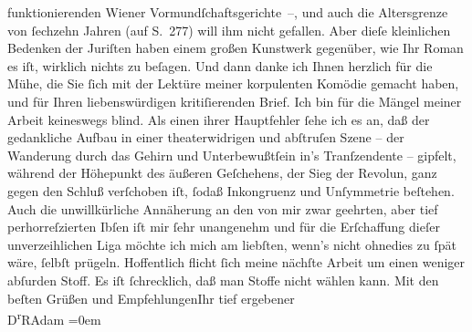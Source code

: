 \begin{ledgroupsized}[t]{13cm}
               funktionierenden Wiener Vormundſchaftsgerichte –,
               und auch die Altersgrenze von ſechzehn Jahren (auf S. 277) will ihm nicht gefallen.
               Aber dieſe kleinlichen Bedenken der Juriſten haben einem großen Kunstwerk gegenüber,
               wie Ihr Roman es iſt, wirklich
               nichts zu beſagen.\pend
           \pstart
           Und dann danke ich Ihnen herzlich für die Mühe, die Sie ſich mit der Lektüre meiner
               korpulenten Komödie gemacht
               haben, und für Ihren liebenswürdigen kritiſierenden Brief. Ich bin für die Mängel
               meiner Arbeit keineswegs blind. Als einen ihrer Hauptfehler ſehe ich es an, daß der
               gedankliche Aufbau in einer theaterwidrigen und abſtruſen Szene – der Wanderung durch
               das Gehirn {\pb}und Unterbewußtſein in’s
               Tranſzendente – gipfelt, während der Höhepunkt des äußeren Geſchehens, der Sieg der
                  Revolun, ganz gegen den Schluß verſchoben iſt, ſodaß Inkongruenz und Unſymmetrie
               beſtehen. Auch die unwillkürliche Annäherung an den von mir zwar geehrten, aber tief
               perhorreſzierten Ibſen iſt mir ſehr unangenehm
               und für die Erſchaffung dieſer unverzeihlichen Liga möchte ich mich am liebſten,
               wenn’s nicht ohnedies zu ſpät wäre, ſelbſt prügeln.\pend
           \pstart
           Hoffentlich flicht ſich meine nächſte Arbeit um einen weniger abſurden Stoff. Es iſt
               ſchrecklich, daß man Stoffe nicht wählen kann.\pend
           \pstart
           Mit den beſten Grüßen und Empfehlungen\hspace*{1.5em}Ihr\pend
           \pstart
           tief ergebener{\\[\baselineskip]}\spacefill\mbox{D\textsuperscript{r}RAdam}\pend
           \leftskip=0em{}
         
         \endnumbering{}\end{ledgroupsized}  \newcommand{\dateiname}{L02500}\newcommand{\titel}{Robert Adam an Arthur Schnitzler, 11. 5. 1928}\newcommand{\editorInnen}{Martin Anton Müller und Gerd-Hermann Susen}
      